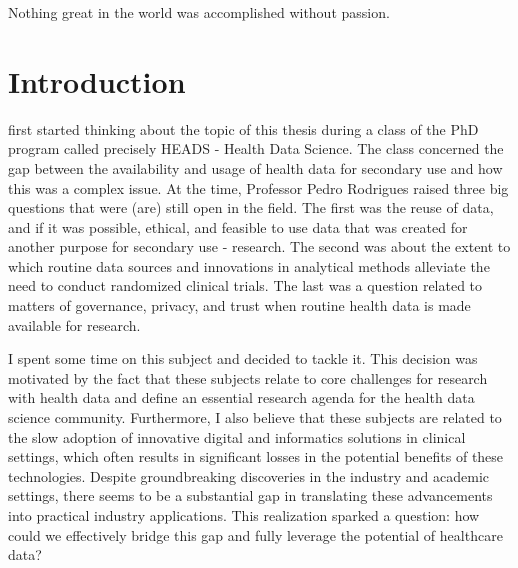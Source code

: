 

\begin{savequote}[85mm]
    Nothing great in the world was accomplished 
    without passion.
    \end{savequote}


\chapter{Introduction} \label{chap:intro}

\acresetall

{} first started thinking about the topic of this thesis during a class of the PhD program called precisely HEADS - Health Data Science. The class concerned the gap between the availability and usage of health data for secondary use and how this was a complex issue. At the time, Professor Pedro Rodrigues raised three big questions that were (are) still open in the field. The first was the reuse of data, and if it was possible, ethical, and feasible to use data that was created for another purpose for secondary use - research. The second was about the extent to which routine data sources and innovations in analytical methods alleviate the need to conduct randomized clinical trials. The last was a question related to matters of governance, privacy, and trust when routine health data is made available for research.

I spent some time on this subject and decided to tackle it. This decision was motivated by the fact that these subjects relate to core challenges for research with health data and define an essential research agenda for the health data science community. Furthermore, I also believe that these subjects are related to the slow adoption of innovative digital and informatics solutions in clinical settings, which often results in significant losses in the potential benefits of these technologies. Despite groundbreaking discoveries in the industry and academic settings, there seems to be a substantial gap in translating these advancements into practical industry applications. This realization sparked a question: how could we effectively bridge this gap and fully leverage the potential of healthcare data?\\




